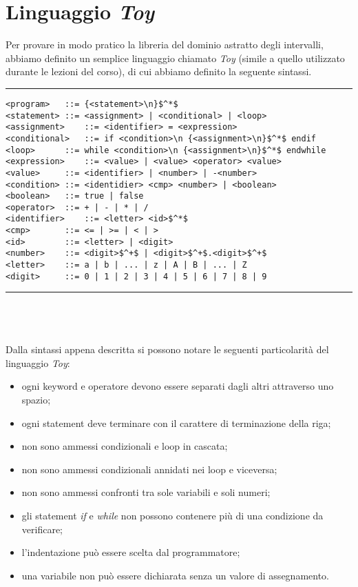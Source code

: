 \documentclass[a4paper, 10pt]{report}
\begin{document}
\section*{Linguaggio \textit{Toy}}
Per provare in modo pratico la libreria del dominio astratto degli intervalli, abbiamo definito un semplice linguaggio chiamato \textit{Toy} (simile a quello utilizzato durante le lezioni del corso), di cui abbiamo definito la seguente sintassi.
\newline
\newline

\hrule
\begin{lstlisting}[basicstyle=\footnotesize\ttfamily]
<program>	::= {<statement>\n}$^*$
<statement>	::= <assignment> | <conditional> | <loop>
<assignment>	::= <identifier> = <expression>
<conditional>	::= if <condition>\n {<assignment>\n}$^*$ endif
<loop>		::= while <condition>\n {<assignment>\n}$^*$ endwhile 
<expression>	::= <value> | <value> <operator> <value>
<value>		::= <identifier> | <number> | -<number>
<condition>	::= <identidier> <cmp> <number> | <boolean>
<boolean>	::= true | false
<operator>	::= + | - | * | / 
<identifier>	::= <letter> <id>$^*$
<cmp>		::= <= | >= | < | >
<id>		::= <letter> | <digit>
<number>	::= <digit>$^+$ | <digit>$^+$.<digit>$^+$
<letter>	::= a | b | ... | z | A | B | ... | Z
<digit>		::= 0 | 1 | 2 | 3 | 4 | 5 | 6 | 7 | 8 | 9
\end{lstlisting}

\hrule
~\\\\\\
\noindent
Dalla sintassi appena descritta si possono notare le seguenti particolarità del linguaggio \textit{Toy}:
\begin{itemize}
	\item ogni keyword e operatore devono essere separati dagli altri attraverso uno spazio;
	\item ogni statement deve terminare con il carattere di terminazione della riga;
	\item non sono ammessi condizionali e loop in cascata;
	\item non sono ammessi condizionali annidati nei loop e viceversa;
	\item non sono ammessi confronti tra sole variabili e soli numeri;
	\item gli statement \textit{if} e \textit{while} non possono contenere più di una condizione da verificare;
	\item l'indentazione può essere scelta dal programmatore;
	\item una variabile non può essere dichiarata senza un valore di assegnamento.
\end{itemize}
\end{document}

